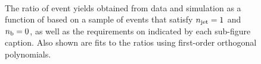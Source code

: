 \begin{figure}[h!]
  \begin{center}
    \\
    \caption{The ratio of event yields obtained from data and simulation as a function of \mht [GeV] based on a sample of \mj events that satisfy $n_{\text{jet}} = 1$ and $n_{\text{b}} = 0$, as well as the requirements on \scalht indicated by each sub-figure caption. Also shown are fits to the ratios using first-order orthogonal polynomials.}
    \label{fig:mhtval_Mu_eq1j_eq0b}
  \end{center}
\end{figure}

